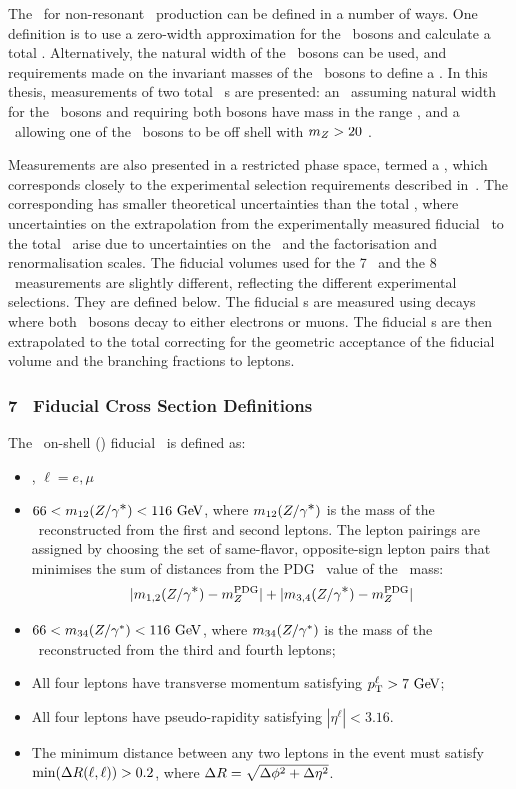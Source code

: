 The \cx\ for non-resonant \ZZ\ production can be defined in a number of
ways. One definition is to use a zero-width approximation for the \Z\ bosons and
calculate a total \cx. Alternatively, the natural width of the \Z\
bosons can be used, and requirements made on the invariant masses of the \Z\
bosons to define a \cx. In this thesis, measurements of two total \ZZ\ \cx s
are presented: an \intro{on-shell} \cx\, assuming natural width for the
\Z\ bosons and requiring both bosons have mass in the range \sstooosZ, and a
\cx\ allowing one of the \Z\ bosons to be off shell with $m_{Z}>20$
\gev.

Measurements are also presented in a restricted phase space, termed a
, which corresponds closely to the experimental selection
requirements described in~\chap{ObjEventSelection}. The corresponding
\intro{fiducial \cx} has smaller theoretical uncertainties than the total \cx,
where uncertainties on the extrapolation from the experimentally measured
fiducial \cx\ to the total \cx\ arise due to uncertainties on the \partDF\ and
the factorisation and renormalisation scales. The fiducial volumes used for the
7 \tev\ and the 8 \tev\ measurements are slightly different, reflecting the
different experimental selections. They are defined below. The fiducial
\cx s are measured using decays where both \Z\ bosons decay to either electrons
or muons. The fiducial
\cx s are then extrapolated to the total \cx  correcting for
the geometric acceptance of the fiducial volume and the branching
fractions to leptons.

\subsubsection{7 \tev\ Fiducial Cross Section Definitions}

The \zzllll\ on-shell (\ZZ) fiducial \cx\ is defined as:

\begin{itemize}
\item{\ZorgZorglplmlplm, $\ell = e,\mu$}
\item{ $66 < m_{12}(\Zorgv) <  116\GeV$, where $m_{12}(Z/\gamma^{\textstyle *})$ is
the mass of the \Z\ reconstructed from the first and second leptons.  The
lepton pairings are assigned by choosing the set of 
same-flavor, opposite-sign lepton pairs that minimises the sum of distances from
the PDG~\cite{PDG} value of the \Z\ mass:
\begin{equation}
|m_{1,2}(Z/\gamma^{\textstyle *}) - m_{Z}^{\rm PDG}| + |m_{3,4}(Z/\gamma^{\textstyle *}) - m_{Z}^{\rm PDG}|
\end{equation}
}
\item{ $66 < m_{34}(\Z/\gamma^*) <  116\GeV$, where $m_{34}(Z/\gamma^*)$ is
the mass of the \Z\ reconstructed from the third and fourth leptons;}
\item All four leptons have transverse momentum satisfying $\pT^{\ell} > 7\GeV$;
\item All four leptons have pseudo-rapidity satisfying $|\eta^{\ell}| < 3.16$.
\item{ The minimum distance between any two leptons in the event must satisfy
$\mathrm{min}(\Delta R(\ell,\ell)) > 0.2$, where $\Delta R = \sqrt{\Delta \phi^{2} +
\Delta \eta^{2}}$.}
\end{itemize}


